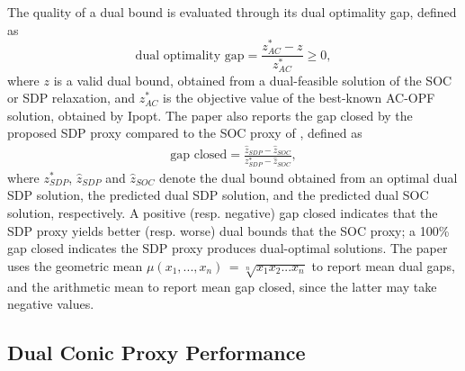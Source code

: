 The quality of a dual bound is evaluated through its dual optimality gap, defined as 
\begin{equation}
    \text{dual optimality gap} = \frac{z^{*}_{AC} - z}{z^{*}_{AC}} \geq 0,
\end{equation}
where $z$ is a valid dual bound, obtained from a dual-feasible solution of the SOC or SDP relaxation, and $z^{*}_{AC}$ is the objective value of the best-known AC-OPF solution, obtained by Ipopt.
The paper also reports the gap closed by the proposed SDP proxy compared to the SOC proxy of \cite{qiu2024dual}, defined as
\begin{align}
    \label{eq:gap_closed}
    \text{gap closed} = \frac{\hat{z}_{SDP} - \hat{z}_{SOC}}{z^{*}_{SDP} - \hat{z}_{SOC}},  
\end{align}
where $z^{*}_{SDP}$, $\hat{z}_{SDP}$ and $\hat{z}_{SOC}$ denote the dual bound obtained from an optimal dual SDP solution, the predicted dual SDP solution, and the predicted dual SOC solution, respectively.
A positive (resp. negative) gap closed indicates that the SDP proxy yields better (resp. worse) dual bounds that the SOC proxy; a 100\% gap closed indicates the SDP proxy produces dual-optimal solutions.
The paper uses the geometric mean $\mu(x_{1}, ..., x_{n}) \, {=} \sqrt[n]{x_{1} x_{2} ... x_{n}}$ to report mean dual gaps, and the arithmetic mean to report mean gap closed, since the latter may take negative values.



\subsection{Dual Conic Proxy Performance}
\label{sec:results:DCP}

